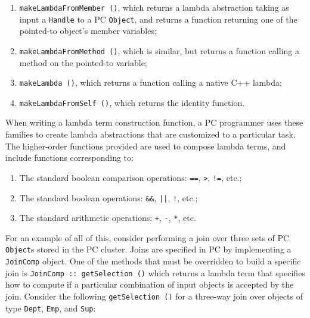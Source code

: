 \begin{enumerate}

\vspace{-5pt}
\item \texttt{makeLambdaFromMember ()}, which returns 
a lambda abstraction taking as input a \texttt{Handle} to a PC \texttt{Object}, and returns a function returning one of the pointed-to object's member variables;

\vspace{-5pt}
\item 
\texttt{makeLambdaFromMethod ()}, which is similar, but returns a function calling a method on the pointed-to variable;

\vspace{-5pt}
\item \texttt{makeLambda ()}, which returns a function calling
a native C++ lambda;

\vspace{-5pt}
\item \texttt{makeLambdaFromSelf ()}, which returns the identity function.

\end{enumerate}

\vspace{-5pt}
\noindent
When writing a lambda term construction function, a PC programmer uses these families to create lambda abstractions that
are customized to a particular task.
The higher-order functions provided are used to compose lambda terms, and
include functions corresponding to:

\begin{enumerate}
\vspace{-5pt}
\item
The standard boolean comparison operations: \texttt{==}, \texttt{>}, \texttt{!=}, etc.;

\vspace{-5pt}
\item
The standard boolean
operations: \texttt{\&\&}, \texttt{||}, \texttt{!}, etc.;

\vspace{-5pt}
\item
The standard arithmetic operations: \texttt{+}, \texttt{-}, \texttt{*}, etc.  
\end{enumerate}

For an example of all of this, consider performing a join over three
sets of PC \texttt{Object}s stored in the PC cluster.  
Joins are specified in PC 
by implementing a \texttt{JoinComp} object. One of the methods that
must be overridden to build a specific join is \texttt{JoinComp :: getSelection ()}
which returns a lambda term
that specifies how to compute if a particular combination of input objects is accepted by the join.  Consider the following
\texttt{getSelection ()} for a three-way join over objects of type \texttt{Dept}, \texttt{Emp}, and \texttt{Sup}:



